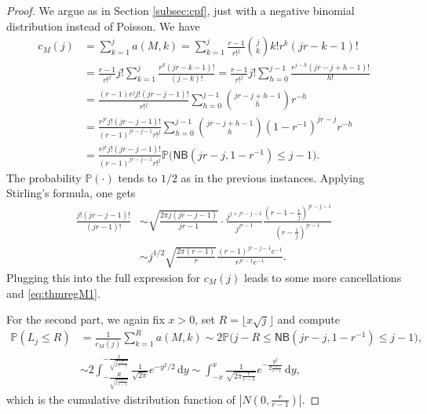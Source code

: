 \documentclass[10pt,a4paper]{amsart}
\newcommand{\Di}{\,\mathrm{d}}
\newcommand{\IP}{\mathbb{P}}
\newcommand{\NB}{\mathsf{NB}}
\newcommand{\floor}[1]{\lfloor #1 \rfloor}
\begin{document}
\begin{proof}
We argue as in Section \ref{subsec:cpf}, just with a negative binomial distribution instead of Poisson. We have
\begin{align*}
    c_M(j) &= \sum_{k=1}^j a(M,k)
    = \sum_{k=1}^j \frac{r-1}{r!^{j}} \binom{j}{k} k! r^k (jr-k-1)! \\
    &= \frac{r-1}{r!^{j}} j! \sum_{k=1}^j  \frac{r^k (jr-k-1)!}{(j-k)!}
    = \frac{r-1}{r!^{j}} j! \sum_{h=0}^{j-1}  \frac{r^{j-h} (jr-j+h-1)!}{h!} \\
    &= \frac{(r-1)r^j j!(jr-j-1)!}{r!^{j}}  \sum_{h=0}^{j-1} \binom{jr-j+h-1}{h} r^{-h} \\
    &= \frac{r^{jr} j!(jr-j-1)!}{(r-1)^{jr-j-1}r!^{j}}  \sum_{h=0}^{j-1} \binom{jr-j+h-1}{h} (1-r^{-1})^{jr-j} r^{-h} \\
    &= \frac{r^{jr} j!(jr-j-1)!}{(r-1)^{jr-j-1}r!^{j}} 
    \IP\big(\NB(jr-j,1-r^{-1})\leq j-1\big).
\end{align*}
The probability $\IP(\cdot)$ tends to $1/2$ as in the previous instances. Applying Stirling's formula, one gets
\begin{align*}
 \frac{j!(jr-j-1)!}{(jr-1)!} 
 &\sim \sqrt{\frac{2\pi j(jr-j-1)}{jr-1}} \cdot \frac{j^{j+jr-j-1}}{j^{jr-1}} \frac{\left(r-1-\frac{1}{j}\right)^{jr-j-1}}{\left(r-\frac{1}{j}\right)^{jr-1}}\\
 &\sim j^{1/2} \sqrt{\frac{2\pi (r-1)}{r}} \frac{(r-1)^{jr-j-1} e^{-1}}{r^{jr-1} e^{-1}}.
\end{align*}
Plugging this into the full expression for $c_M(j)$ leads to some more cancellations and \eqref{eq:thmregM1}.

For the second part, we again fix $x>0$, set $R=\floor{x\sqrt{j}}$ and compute
 \begin{align*}
  \IP( L_j \leq R)
  &= \frac{1}{c_M(j)} \sum_{k=1}^R a(M,k)
   \sim
    2\IP\big(j-R\leq \NB(jr-j,1-r^{-1})\leq j-1\big), \\
  &\sim 2\int_{-\frac{R}{\sqrt{j\frac{r}{r-1}}}}^{-\frac{1}{\sqrt{j\frac{r}{r-1}}}} \frac{1}{\sqrt{2\pi}} e^{-y^2/2} \Di y
   \sim \int_{-x}^x \frac{1}{\sqrt{2\pi \frac{r}{r-1}}} e^{-\frac{y^2}{2\frac{r}{r-1}}} \Di y,
 \end{align*}
 which is the cumulative distribution function of $\left|N\left(0,\frac{r}{r-1}\right)\right|$.
\end{proof}
\end{document}
